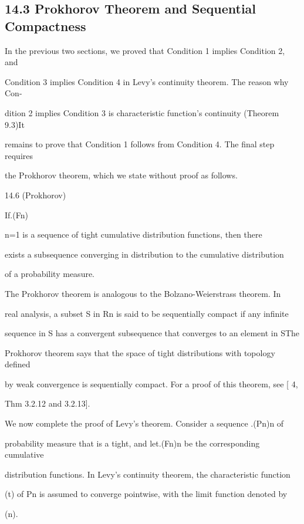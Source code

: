 \subsection*{14.3 Prokhorov Theorem and Sequential Compactness}

In the previous two sections, we proved that Condition 1 implies Condition 2, and

Condition 3 implies Condition 4 in Levy's continuity theorem. The reason why Con-

dition 2 implies Condition 3 is characteristic function's continuity (Theorem 9.3)It

remains to prove that Condition 1 follows from Condition 4. The final step requires

the Prokhorov theorem, which we state without proof as follows.

\begin{thmbox}{14.6 (Prokhorov)}
\end{thmbox}

If.(Fn)\infty

n=1 is a sequence of tight cumulative distribution functions, then there

exists a subsequence converging in distribution to the cumulative distribution

of a probability measure.

The Prokhorov theorem is analogous to the Bolzano-Weierstrass theorem. In

real analysis, a subset S in Rn is said to be sequentially compact if any infinite

sequence in S has a convergent subsequence that converges to an element in SThe

Prokhorov theorem says that the space of tight distributions with topology defined

by weak convergence is sequentially compact. For a proof of this theorem, see [ 4,

Thm 3.2.12 and 3.2.13].

We now complete the proof of Levy's theorem. Consider a sequence .(Pn)n of

probability measure that is a tight, and let.(Fn)n be the corresponding cumulative

distribution functions. In Levy's continuity theorem, the characteristic function

\phin(t) of Pn is assumed to converge pointwise, with the limit function denoted by

\phi(n).

